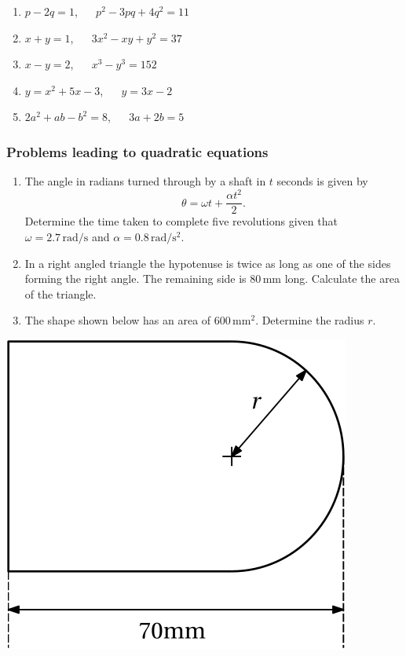 \documentclass[
  12pt,
  oneside]{book}
\providecommand{\tightlist}{%
  \setlength{\itemsep}{0pt}\setlength{\parskip}{0pt}}
\theoremstyle{definition}
\theoremstyle{definition}
\theoremstyle{definition}
\theoremstyle{definition}
\theoremstyle{remark}
\begin{document}
\begin{enumerate}
  \begin{enumerate}
  \def\labelenumii{\roman{enumii})}
  \tightlist
  \item
    \(p-2q=1\), ~~ \(p^2-3pq+4q^2=11\)
  \item
    \(x+y=1\), ~~ \(3x^2-xy+y^2=37\)
  \item
    \(x-y=2\), ~~ \(x^3-y^3=152\)
  \item
    \(y=x^2+5x-3\), ~~ \(y=3x-2\)
  \item
    \(2a^2+ab-b^2=8\), ~~ \(3a+2b=5\)
  \end{enumerate}
\end{enumerate}

\hypertarget{problems-leading-to-quadratic-equations}{%
\subsubsection*{Problems leading to quadratic equations}\label{problems-leading-to-quadratic-equations}}

\begin{enumerate}
\def\labelenumi{\arabic{enumi}.}
\setcounter{enumi}{4}
\item
  The angle in radians turned through by a shaft in \(t\) seconds is given by
  \[\theta=\omega t+\frac{\alpha t^2}{2}.\]
  Determine the time taken to complete five revolutions given that \(\omega=2.7\, \mathrm{rad/s}\) and \(\alpha=0.8\, \mathrm{rad/s^2}\).
\item
  In a right angled triangle the hypotenuse is twice as long as one of the sides forming the right angle. The remaining side is \(80\,\mathrm{mm}\) long. Calculate the area of the triangle.
\item
  The shape shown below has an area of \(600\,\mathrm{mm^2}\). Determine the radius \(r\).
\end{enumerate}

\begin{center}\includegraphics{t03-shape1} \end{center}
\end{document}
